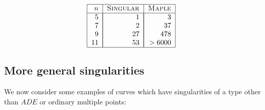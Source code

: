 \documentclass[a4paper,11pt]{amsart}%
\theoremstyle{definition}
\theoremstyle{plain}
\theoremstyle{remark}
\begin{document}
\[%
\begin{tabular}
[c]{|r|l|l|}\hline
$n$ & \textsc{Singular} & \textsc{Maple}\\\hline
$5$ & \multicolumn{1}{|r|}{$1$} & \multicolumn{1}{|r|}{$3$}\\
$7$ & \multicolumn{1}{|r|}{$2$} & \multicolumn{1}{|r|}{$37$}\\
$9$ & \multicolumn{1}{|r|}{$27$} & \multicolumn{1}{|r|}{$478$}\\
$11$ & \multicolumn{1}{|r|}{$53$} & \multicolumn{1}{|r|}{$>6000$}\\\hline
\end{tabular}
\
\]


\subsection{More general singularities\label{sec some more general examples}}

We now consider some examples of curves which have singularities of a type
other than $ADE$ or ordinary multiple points:
\end{document}
